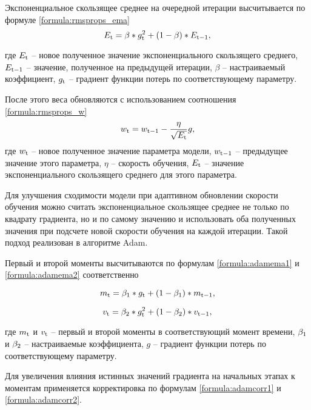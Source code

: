 Экспоненциальное скользящее среднее на очередной итерации высчитывается по формуле \ref{formula:rmsprops_ema}
\begin{equation}\label{formula:rmsprops_ema}
	E_{\rm{t}} = \beta * g_{\rm{t}}^2 + (1 - \beta) * E_{\rm{t-1}},
\end{equation}

где $E_{\rm{t}}$ -- новое полученное значение экспоненциального скользящего среднего, $E_{\rm{t-1}}$ -- значение, полученное на предыдущей итерации, $\beta$ -- настраиваемый коэффициент, $g_{\rm{t}}$ -- градиент функции потерь по соответствующему параметру.

После этого веса обновляются с использованием соотношения \ref{formula:rmsprops_w}
\begin{equation}\label{formula:rmsprops_w}
	w_{\rm{t}} = w_{\rm{t-1}} - \frac{\eta}{\sqrt{E_{\rm{t}}}}g,
\end{equation}
где $w_{\rm{t}}$ -- новое полученное значение параметра модели, $w_{\rm{t-1}}$ -- предыдущее значение этого параметра, $\eta$ -- скорость обучения, $E_{\rm{t}}$ -- значение экспоненциального скользящего среднего для этого параметра.

Для улучшения сходимости модели при адаптивном обновлении скорости обучения можно считать экспоненциальное скользящее среднее не только по квадрату градиента, но и по самому значению и использовать оба полученных значения при подсчете новой скорости обучения на каждой итерации. 
Такой подход реализован в алгоритме Adam.

Первый и второй моменты высчитываются по формулам \ref{formula:adamema1} и \ref{formula:adamema2} соответственно

\begin{equation}\label{formula:adamema1}
	m_{\rm{t}} = \beta_{\rm{1}} * g_{\rm{t}} + (1 - \beta_{\rm{1}}) * m_{\rm{t-1}},
\end{equation}

\begin{equation}\label{formula:adamema2}
	v_{\rm{t}} = \beta_{\rm{2}} * g_{\rm{t}}^2 + (1 - \beta_{\rm{2}}) * v_{\rm{t-1}},
\end{equation}

где $m_{\rm{t}}$ и $v_{\rm{t}}$ -- первый и второй моменты в соответствующий момент времени, $\beta_{\rm{1}}$ и $\beta_{\rm{2}}$ -- настраиваемые коэффициента, $g$ -- градиент функции потерь по соответствующему параметру.

Для увеличения влияния истинных значений градиента на начальных этапах к моментам применяется корректировка по формулам \ref{formula:adamcorr1} и \ref{formula:adamcorr2}.

